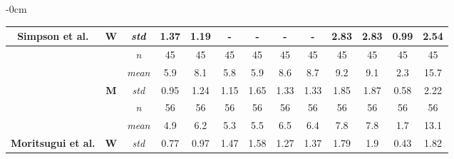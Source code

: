 \documentclass[journal,article,submit,pdftex,moreauthors]{Definitions/mdpi}
\begin{document}
\begin{table}[H]
\begin{adjustwidth}{-\extralength}{0cm}
{\begin{tabular}{ccccccccccccc}
\multirow{-6}{*}{\textbf{Simpson et al.}} & \multirow{-3}{*}{{\color[HTML]{FE0000} \textbf{W}}} & {\color[HTML]{FE0000} \textit{std}} & {\color[HTML]{FE0000} 1.37} & {\color[HTML]{FE0000} 1.19} & {\color[HTML]{FE0000} -} & {\color[HTML]{FE0000} -} & {\color[HTML]{FE0000} -} & {\color[HTML]{FE0000} -} & {\color[HTML]{FE0000} 2.83} & {\color[HTML]{FE0000} 2.83} & {\color[HTML]{FE0000} 0.99} & {\color[HTML]{FE0000} 2.54} \\ \hline
 &  & {\color[HTML]{3531FF} \textit{n}} & {\color[HTML]{3531FF} 45} & {\color[HTML]{3531FF} 45} & {\color[HTML]{3531FF} 45} & {\color[HTML]{3531FF} 45} & {\color[HTML]{3531FF} 45} & {\color[HTML]{3531FF} 45} & {\color[HTML]{3531FF} 45} & {\color[HTML]{3531FF} 45} & {\color[HTML]{3531FF} 45} & {\color[HTML]{3531FF} 45} \\ \cline{3-13} 
 &  & {\color[HTML]{3531FF} \textit{mean}} & {\color[HTML]{3531FF} 5.9} & {\color[HTML]{3531FF} 8.1} & {\color[HTML]{3531FF} 5.8} & {\color[HTML]{3531FF} 5.9} & {\color[HTML]{3531FF} 8.6} & {\color[HTML]{3531FF} 8.7} & {\color[HTML]{3531FF} 9.2} & {\color[HTML]{3531FF} 9.1} & {\color[HTML]{3531FF} 2.3} & {\color[HTML]{3531FF} 15.7} \\ \cline{3-13} 
 & \multirow{-3}{*}{{\color[HTML]{3531FF} \textbf{M}}} & {\color[HTML]{3531FF} \textit{std}} & {\color[HTML]{3531FF} 0.95} & {\color[HTML]{3531FF} 1.24} & {\color[HTML]{3531FF} 1.15} & {\color[HTML]{3531FF} 1.65} & {\color[HTML]{3531FF} 1.33} & {\color[HTML]{3531FF} 1.33} & {\color[HTML]{3531FF} 1.85} & {\color[HTML]{3531FF} 1.87} & {\color[HTML]{3531FF} 0.58} & {\color[HTML]{3531FF} 2.22} \\ \cline{2-13} 
 &  & {\color[HTML]{FE0000} \textit{n}} & {\color[HTML]{FE0000} 56} & {\color[HTML]{FE0000} 56} & {\color[HTML]{FE0000} 56} & {\color[HTML]{FE0000} 56} & {\color[HTML]{FE0000} 56} & {\color[HTML]{FE0000} 56} & {\color[HTML]{FE0000} 56} & {\color[HTML]{FE0000} 56} & {\color[HTML]{FE0000} 56} & {\color[HTML]{FE0000} 56} \\ \cline{3-13} 
 &  & {\color[HTML]{FE0000} \textit{mean}} & {\color[HTML]{FE0000} 4.9} & {\color[HTML]{FE0000} 6.2} & {\color[HTML]{FE0000} 5.3} & {\color[HTML]{FE0000} 5.5} & {\color[HTML]{FE0000} 6.5} & {\color[HTML]{FE0000} 6.4} & {\color[HTML]{FE0000} 7.8} & {\color[HTML]{FE0000} 7.8} & {\color[HTML]{FE0000} 1.7} & {\color[HTML]{FE0000} 13.1} \\ \cline{3-13} 
\multirow{-6}{*}{\textbf{Moritsugui et al.}} & \multirow{-3}{*}{{\color[HTML]{FE0000} \textbf{W}}} & {\color[HTML]{FE0000} \textit{std}} & {\color[HTML]{FE0000} 0.77} & {\color[HTML]{FE0000} 0.97} & {\color[HTML]{FE0000} 1.47} & {\color[HTML]{FE0000} 1.58} & {\color[HTML]{FE0000} 1.27} & {\color[HTML]{FE0000} 1.37} & {\color[HTML]{FE0000} 1.79} & {\color[HTML]{FE0000} 1.9} & {\color[HTML]{FE0000} 0.43} & {\color[HTML]{FE0000} 1.82} \\ \hline

\end{tabular}}
\end{adjustwidth}
\end{table}
\end{document}
